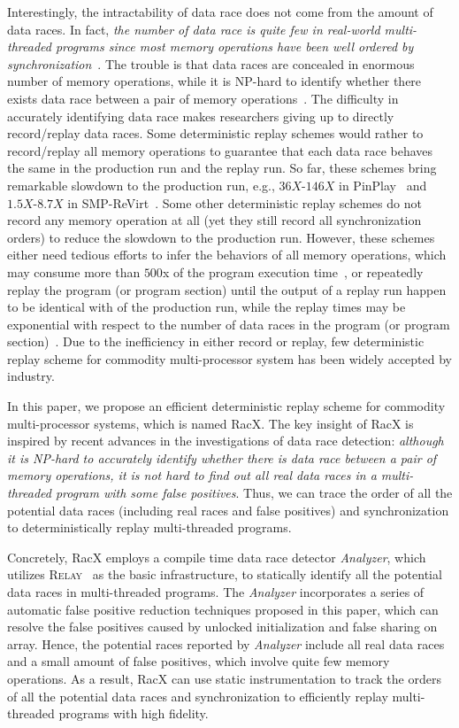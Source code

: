 \documentclass[10pt,onecolumn,letterpaper]{article}
\begin{document}
Interestingly, the intractability of data race does not come from
the amount of data races. In fact, \emph{the number of data race is
quite few in real-world multi-threaded programs since most memory
operations have been well ordered by
synchronization}~\cite{Marino09PLDI}. The trouble is that data races
are concealed in enormous number of memory operations, while it is
NP-hard to identify whether there exists data race between a pair of
memory operations~\cite{Netzer90ICPP}. The difficulty in accurately
identifying data race makes researchers giving up to directly
record/replay data races. Some deterministic replay schemes would
rather to record/replay all memory operations to guarantee that each
data race behaves the same in the production run and the replay run.
So far, these schemes bring remarkable slowdown to the production
run, e.g., $36X$-$146X$ in PinPlay~\cite{Patil10CGO} and
$1.5X$-$8.7X$ in SMP-ReVirt~\cite{Dunlap08VEE}. Some other
deterministic replay schemes do not record any memory operation at
all (yet they still record all synchronization orders) to reduce the
slowdown to the production run. However, these schemes either need
tedious efforts to infer the behaviors of all memory operations,
which may consume more than $500$x of the program execution
time~\cite{Altekar09SOSP}, or repeatedly replay the program (or
program section) until the output of a replay run happen to be
identical with of the production run, while the replay times may be
exponential with respect to the number of data races in the program
(or program section)~\cite{Park09SOSP,Lee09MICRO}. Due to the
inefficiency in either record or replay, few deterministic replay
scheme for commodity multi-processor system has been widely accepted
by industry.

In this paper, we propose an efficient deterministic replay scheme
for commodity multi-processor systems, which is named RacX. The key
insight of RacX is inspired by recent advances in the investigations
of data race detection: \emph{although it is NP-hard to accurately
identify whether there is data race between a pair of memory
operations, it is not hard to find out all real data races in a
multi-threaded program with some false positives}. Thus, we can
trace the order of all the potential data races (including real
races and false positives) and synchronization to deterministically
replay multi-threaded programs.

Concretely, RacX employs a compile time data race detector
\emph{Analyzer}, which utilizes R\textsc{elay}~\cite{Voung07FSE} as
the basic infrastructure, to statically identify all the potential
data races in multi-threaded programs. The \emph{Analyzer}
incorporates a series of automatic false positive reduction
techniques proposed in this paper, which can resolve the false
positives caused by unlocked initialization and false sharing on
array. Hence, the potential races reported by \emph{Analyzer}
include all real data races and a small amount of false positives,
which involve quite few memory operations. As a result, RacX can use
static instrumentation to track the orders of all the potential data
races and synchronization to efficiently replay multi-threaded
programs with high fidelity.
\end{document}

